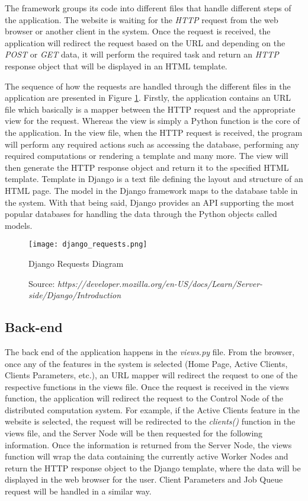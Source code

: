 \documentclass[10pt]{report}
\begin{document}
The framework groups its code into different files that handle different steps of the application. The website is waiting for the \textit{HTTP} request from the web browser or another client in the system. Once the request is received, the application will redirect the request based on the URL and depending on the \textit{POST} or \textit{GET} data, it will perform the required task and return an \textit{HTTP} response object that will be displayed in an HTML template.
\newline

The sequence of how the requests are handled through the different files in the application are presented in Figure \ref{fig:djangoreq}. Firstly, the application contains an URL file which basically is a mapper between the HTTP request and the appropriate view for the request. Whereas the view is simply a Python function is the core of the application. In the view file, when the HTTP request is received, the program will perform any required actions such as accessing the database, performing any required computations or rendering a template and many more. The view will then generate the HTTP response object and return it to the specified HTML template. Template in Django is a text file defining the layout and structure of an HTML page. The model in the Django framework maps to the database table in the system. With that being said, Django provides an API supporting the most popular databases for handling the data through the Python objects called models.

\begin{figure}[htp]
    \centering
    \texttt{[image: django\_requests.png]}
    \caption{Django Requests Diagram}
    \label{fig:djangoreq}
    \caption*{Source: \textit{https://developer.mozilla.org/en-US/docs/Learn/Server-side/Django/Introduction}}
\end{figure}

\subsection{Back-end}

The back end of the application happens in the \textit{views.py} file. From the browser, once any of the features in the system is selected (Home Page, Active Clients, Clients Parameters, etc.), an URL mapper will redirect the request to one of the respective functions in the views file. Once the request is received in the views function, the application will redirect the request to the Control Node of the distributed computation system. For example, if the Active Clients feature in the website is selected, the request will be redirected to the \textit{clients()} function in the views file, and the Server Node will be then requested for the following information. Once the information is returned from the Server Node, the views function will wrap the data containing the currently active Worker Nodes and return the HTTP response object to the Django template, where the data will be displayed in the web browser for the user. Client Parameters and Job Queue request will be handled in a similar way.
\newline
\end{document}
